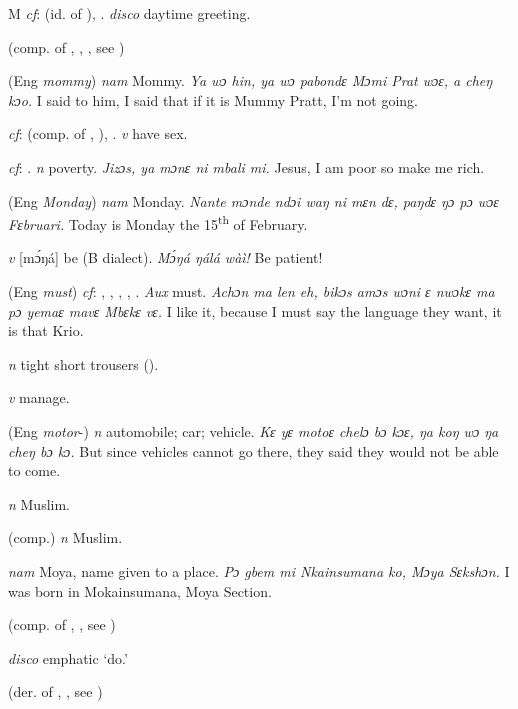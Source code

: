 \begin{letter}{M}
 \textit{cf}:  (id. of ), . \textit{disco} daytime greeting.

 (comp. of , , , see ) 

 (Eng \textit{mommy}) \textit{nam} Mommy. \textit{Ya wɔ hin, ya wɔ pabondɛ Mɔmi Prat wɔɛ, a cheŋ kɔo.} I said to him, I said that if it is Mummy Pratt, I'm not going.

 \textit{cf}:  (comp. of , ), . \textit{v} have sex.

 \textit{cf}: . \textit{n} poverty. \textit{Jizɔs, ya mɔnɛ ni mbali mi.} Jesus, I am poor so make me rich.

 (Eng \textit{Monday}) \textit{nam} Monday. \textit{Nante mɔnde ndɔi waŋ ni mɛn dɛ, paŋdɛ ŋɔ pɔ wɔɛ Fɛbruari.} Today is Monday the 15\textsuperscript{th} of February.

 \textit{v} [mɔ́ŋá] be (B dialect). \textit{Mɔ́ŋá ŋálá wàì!} Be patient!

 (Eng \textit{must}) \textit{cf}: , , , , . \textit{Aux} must. \textit{Achɔn ma len eh, bikɔs amɔs wɔni ɛ nwɔkɛ ma pɔ yemaɛ mavɛ Mbɛkɛ vɛ.} I like it, because I must say the language they want, it is that Krio.

 \textit{n} tight short trousers (\citealt{Pichl1967}). 

 \textit{v} manage.

 (Eng \textit{motor}-) \textit{n} automobile; car; vehicle. \textit{Kɛ yɛ motoɛ chelɔ bɔ kɔɛ, ŋa koŋ wɔ ŋa cheŋ bɔ kɔ.} But since vehicles cannot go there, they said they would not be able to come.

 \textit{n} Muslim.

 (comp.) \textit{n} Muslim.

 \textit{nam} Moya, name given to a place. \textit{Pɔ gbem mi Nkainsumana ko, Mɔya Sɛkshɔn.} I was born in Mokainsumana, Moya Section.

 (comp. of , , see ) 

 \textit{disco} emphatic ‘do.'

 (der. of , , see )


\end{letter}
